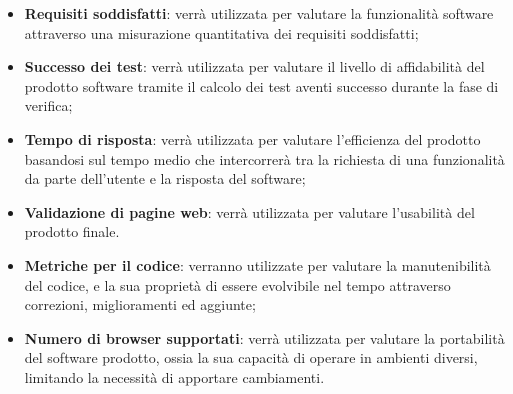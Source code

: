 	\begin{itemize}
		\item \textbf{Requisiti soddisfatti}: verrà utilizzata per valutare la funzionalità software attraverso una misurazione quantitativa dei requisiti soddisfatti;
		\item \textbf{Successo dei test}: verrà utilizzata per valutare il livello di affidabilità del prodotto software tramite il calcolo dei test aventi successo durante la fase di verifica;
		\item \textbf{Tempo di risposta}: verrà utilizzata per valutare l'efficienza del prodotto basandosi sul tempo medio che intercorrerà tra la richiesta di una funzionalità da parte dell'utente e la risposta del software;
		\item \textbf{Validazione di pagine web}: verrà utilizzata per valutare l'usabilità del prodotto finale.
		\item \textbf{Metriche per il codice}: verranno utilizzate per valutare la manutenibilità del codice, e la sua proprietà di essere evolvibile nel tempo attraverso correzioni, miglioramenti ed aggiunte;
		\item \textbf{Numero di browser supportati}: verrà utilizzata per valutare la portabilità del software prodotto, ossia la sua capacità di operare in ambienti diversi, limitando la necessità di apportare cambiamenti.
	\end{itemize}

